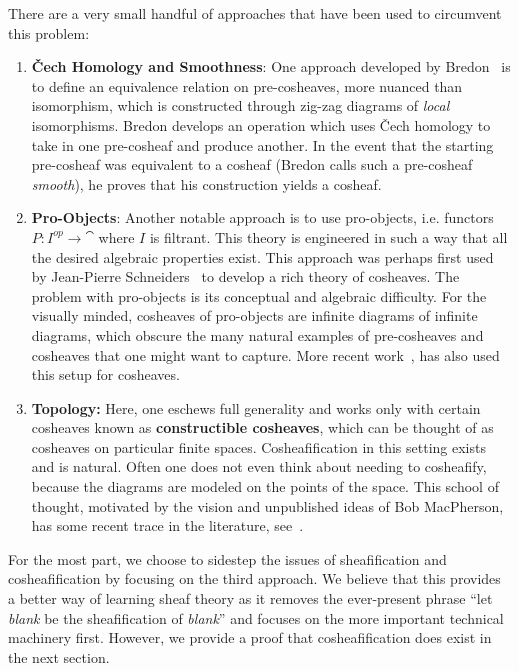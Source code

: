 There are a very small handful of approaches that have been used to circumvent this problem:
\begin{enumerate}
 \item \textbf{\v{C}ech Homology and Smoothness}: One approach developed by Bredon~\cite{bredon-ch,Bredon} is to define an equivalence relation on pre-cosheaves, more nuanced than isomorphism, which is constructed through zig-zag diagrams of \emph{local} isomorphisms. Bredon develops an operation which uses \v{C}ech homology to take in one pre-cosheaf and produce another. In the event that the starting pre-cosheaf was equivalent to a cosheaf (Bredon calls such a pre-cosheaf \emph{smooth}), he proves that his construction yields a cosheaf.

 \item \textbf{Pro-Objects}: Another notable approach is to use pro-objects, i.e. functors $P:I^{op}\to\cat$ where $I$ is filtrant. This theory is engineered in such a way that all the desired algebraic properties exist. This approach was perhaps first used by Jean-Pierre Schneiders~\cite{schneiders-ch} to develop a rich theory of cosheaves. The problem with pro-objects is its conceptual and algebraic difficulty. For the visually minded, cosheaves of pro-objects are infinite diagrams of infinite diagrams, which obscure the many natural examples of pre-cosheaves and cosheaves that one might want to capture. More recent work~\cite{sugiki,prasolov}, has also used this setup for cosheaves.

 \item \textbf{Topology:} Here, one eschews full generality and works only with certain cosheaves known as \textbf{constructible cosheaves}, which can be thought of as cosheaves on particular finite spaces. Cosheafification in this setting exists and is natural. Often one does not even think about needing to cosheafify, because the diagrams are modeled on the points of the space. This school of thought, motivated by the vision and unpublished ideas of Bob MacPherson, has some recent trace in the literature, see~\cite{woolf, dt-lag}.
\end{enumerate}

For the most part, we choose to sidestep the issues of sheafification and cosheafification by focusing on the third approach. We believe that this provides a better way of learning sheaf theory as it removes the ever-present phrase ``let \emph{blank} be the sheafification of \emph{blank}'' and focuses on the more important technical machinery first. However, we provide a proof that cosheafification does exist in the next section.

